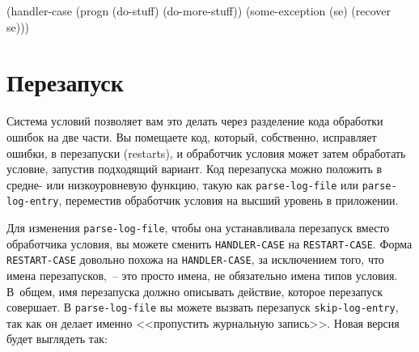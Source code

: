 \begin{lrbox}{\choneninethree}
  \begin{minipage}{\linewidth}
\begin{myverb}
(handler-case
    (progn
      (do-stuff)
      (do-more-stuff))
  (some-exception (se) (recover se)))
\end{myverb} 
  \end{minipage}
\end{lrbox}




\section{Перезапуск}

Система условий позволяет вам это делать через разделение кода обработки ошибок на две
части. Вы помещаете код, который, собственно, исправляет ошибки, в перезапуски (restarts), и
обработчик условия может затем обработать условие, запустив подходящий вариант. Код
перезапуска можно положить в средне- или низкоуровневую функцию, такую как
\lstinline{parse-log-file} или \lstinline{parse-log-entry}, переместив обработчик условия на высший
уровень в приложении.

Для изменения \lstinline{parse-log-file}, чтобы она устанавливала перезапуск вместо обработчика
условия, вы можете сменить \lstinline{HANDLER-CASE} на \lstinline{RESTART-CASE}. Форма
\lstinline{RESTART-CASE} довольно похожа на \lstinline{HANDLER-CASE}, за исключением того, что имена
перезапусков,~-- это просто имена, не обязательно имена типов условия. В~общем, имя
перезапуска должно описывать действие, которое перезапуск совершает. В
\lstinline{parse-log-file} вы можете вызвать перезапуск \lstinline{skip-log-entry}, так как он делает
именно <<пропустить журнальную запись>>. Новая версия будет выглядеть так:

